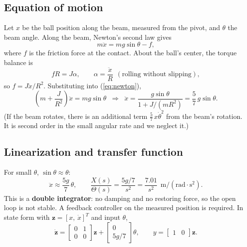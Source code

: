\documentclass[11pt]{article}
\begin{document}
\subsection{Equation of motion}
\label{sec:orgefa88f5}
Let \(x\) be the ball position along the beam, measured from the pivot, and \(\theta\) the beam angle. Along the beam, Newton's second law gives
\begin{equation}
m\ddot{x} = m g \sin\theta - f,
\label{eq:newton}
\end{equation}
where \(f\) is the friction force at the contact. About the ball's center, the torque balance is
\begin{equation}
f R = J \alpha, \qquad \alpha = \frac{\ddot{x}}{R}\ \ (\text{rolling without slipping}),
\label{eq:torque}
\end{equation}
so \(f = J\ddot{x}/R^2\). Substituting into (\ref{eq:newton}),
\begin{equation}
\left(m + \frac{J}{R^2}\right)\ddot{x} = m g \sin\theta
\;\;\Longrightarrow\;\;
\ddot{x} = \frac{g\sin\theta}{1 + J/(mR^2)} = \frac{5}{7}\, g \sin\theta .
\label{eq:nonlinear}
\end{equation}
(If the beam rotates, there is an additional term \(\tfrac{5}{7}\,x\dot\theta^{2}\) from the beam's rotation. It is second order in the small angular rate and we neglect it.)
\subsection{Linearization and transfer function}
\label{sec:orga64a4f4}
For small \(\theta\), \(\sin\theta \approx \theta\):
\begin{equation}
\ddot{x} \approx \frac{5g}{7}\,\theta,
\qquad
\frac{X(s)}{\Theta(s)} = \frac{5g/7}{s^{2}} = \frac{7.01}{s^{2}}\ \ \mathrm{m/(rad\cdot s^{2})}.
\label{eq:tf}
\end{equation}
This is a \textbf{double integrator}: no damping and no restoring force, so the open loop is not stable. A feedback controller on the measured position is required. In state form with \(\mathbf{z} = [x,\ \dot{x}]^{T}\) and input \(\theta\),
\begin{equation}
\dot{\mathbf z} = \begin{bmatrix}0 & 1\\ 0 & 0\end{bmatrix}\mathbf z + \begin{bmatrix}0\\ 5g/7\end{bmatrix}\theta,
\qquad y = \begin{bmatrix}1 & 0\end{bmatrix}\mathbf z .
\end{equation}
\end{document}
